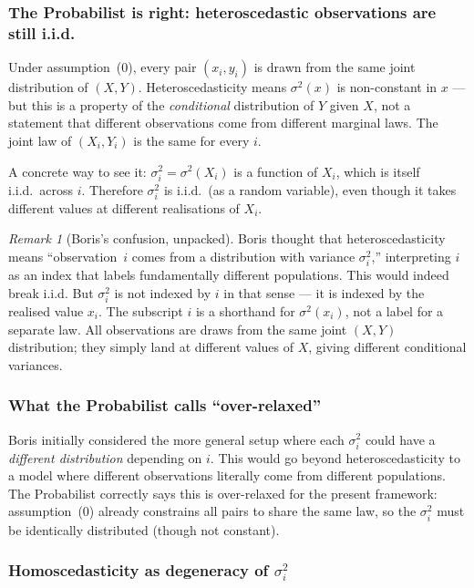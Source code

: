 \documentclass[a4paper,oneside,12pt]{extarticle}
\theoremstyle{plain}
\theoremstyle{definition}
\theoremstyle{remark}
\newtheorem{remark}[proposition]{Remark}
\begin{document}
\subsubsection*{The Probabilist is right: heteroscedastic observations are still i.i.d.}

Under assumption~(0), every pair $(x_i, y_i)$ is drawn from the same
joint distribution of $(X, Y)$.  Heteroscedasticity means
$\sigma^2(x)$ is non-constant in $x$ — but this is a property of the
\emph{conditional} distribution of $Y$ given $X$, not a statement that
different observations come from different marginal laws.  The joint
law of $(X_i, Y_i)$ is the same for every $i$.

A concrete way to see it: $\sigma_i^2 = \sigma^2(X_i)$ is a function
of $X_i$, which is itself i.i.d.\ across $i$.  Therefore $\sigma_i^2$
is i.i.d.\ (as a random variable), even though it takes different
values at different realisations of $X_i$.

\begin{remark}[Boris's confusion, unpacked]
Boris thought that heteroscedasticity means ``observation~$i$ comes
from a distribution with variance $\sigma_i^2$,'' interpreting $i$ as
an index that labels fundamentally different populations.  This would
indeed break i.i.d.  But $\sigma_i^2$ is not indexed by $i$ in that
sense — it is indexed by the realised value $x_i$.  The subscript $i$
is a shorthand for $\sigma^2(x_i)$, not a label for a separate law.
All observations are draws from the same joint $(X, Y)$ distribution;
they simply land at different values of $X$, giving different
conditional variances.
\end{remark}

\subsubsection*{What the Probabilist calls ``over-relaxed''}

Boris initially considered the more general setup where each
$\sigma_i^2$ could have a \emph{different distribution} depending on
$i$.  This would go beyond heteroscedasticity to a model where
different observations literally come from different populations.
The Probabilist correctly says this is over-relaxed for the present framework:
assumption~(0) already constrains all pairs to share the same law,
so the $\sigma_i^2$ must be identically distributed (though not
constant).

\subsubsection*{Homoscedasticity as degeneracy of $\sigma_i^2$}
\end{document}
